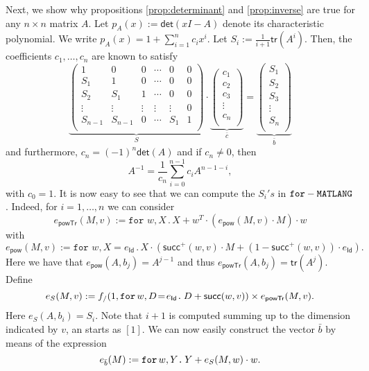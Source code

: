Next, we show why propositions \ref{prop:determinant}  and \ref{prop:inverse} are true for any $n \times n$ matrix $A$.
Let $p_A(x):=\mathsf{det}(xI-A)$ denote its characteristic polynomial.
We write $p_A(x)=1 + \sum_{i=1}^n c_ix^i$. Let $S_i:=\frac{1}{i+1}\mathsf{tr}(A^i)$. 
Then, the coefficients $c_1,\ldots,c_n$ are known to satisfy 
$$
\underbrace{\left(\begin{matrix}
1 & 0 & 0 & \cdots & 0 & 0\\
S_1 & 1 & 0 & \cdots  &0 & 0\\
S_2 & S_1 & 1 & \cdots  &0 & 0\\
\vdots & \vdots & \vdots & \vdots & \vdots & 0\\
S_{n-1} & S_{n-1} & 0 & \cdots & S_1 & 1\\
\end{matrix}\right)}_{S}\cdot
\underbrace{\left(\begin{matrix}
c_1\\
c_2\\
c_3\\
\vdots\\
c_n\\
\end{matrix}\right)}_{\bar c}=\underbrace{\left(\begin{matrix}
S_1\\
S_2\\
S_3\\
\vdots\\
S_n\\
\end{matrix}\right)}_{\bar b}
$$
and furthermore, $c_n=(-1)^n\mathsf{det}(A)$ and if $c_{n}\neq 0$, then
$$
A^{-1}=\frac{1}{c_n}\sum_{i=0}^{n-1}c_i A^{n-1-i},
$$
with $c_0=1$. It is now easy to see that we can compute the $S_i's$ in $\langfor$. Indeed, for
$i=1,\ldots,n$ we can consider
$$
e_{\mathsf{powTr}}(M,v):=\texttt{for } w,X\,.\,X+ w^T\cdot\left(e_{\mathsf{pow}}(M,v)\cdot M\right)\cdot w
$$
with 
$$
e_{\mathsf{pow}}(M,v):=\texttt{for } w,X=e_{\mathsf{Id}}\,.\, X\cdot(\mathsf{succ}^+(w,v)\cdot M+(1-\mathsf{succ}^+(w,v))\cdot e_{\mathsf{Id}}).
$$
Here we have that $e_{\mathsf{pow}}(A,b_j)=A^{j-1}$ and thus $e_{\mathsf{powTr}}(A,b_j)=\mathsf{tr}(A^j)$. Define 
$$
e_{S}(M,v):=f_{/}(1, \initf{e_{\mathsf{Id}}}{w}{D}{D+\mathsf{succ}(w,v)})\times e_{\mathsf{powTr}}(M,v).
$$
Here $e_{S}(A,b_i)=S_i$. Note that $i+1$ is computed summing up to the dimension indicated by $v$, an starts as $[1]$.
We can now easily construct the vector $\bar b$ by means of the expression
$$
e_{\bar b}(M):=\ffor{w}{Y}{Y+e_{S}(M,w)\cdot w}.
$$
